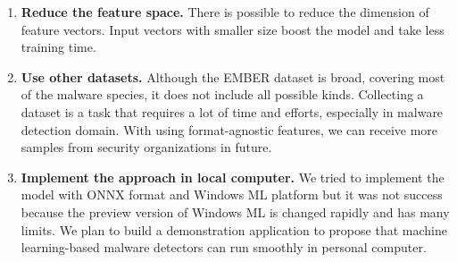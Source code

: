\begin{enumerate}
    \item \textbf{Reduce the feature space. } There is possible to reduce the dimension of feature vectors. Input vectors with smaller size boost the model and take less training time. 
    \item \textbf{Use other datasets. } Although the EMBER dataset is broad, covering most of the malware species, it does not include all possible kinds. Collecting a dataset is a task that requires a lot of time and efforts, especially in malware detection domain. With using format-agnostic features, we can receive more samples from security organizations in future. 
    \item \textbf{Implement the approach in local computer. } We tried to implement the model with ONNX format and Windows ML platform but it was not success because the preview version of Windows ML is changed rapidly and has many limits. We plan to build a demonstration application to propose that machine learning-based malware detectors can run smoothly in personal computer.
\end{enumerate}

